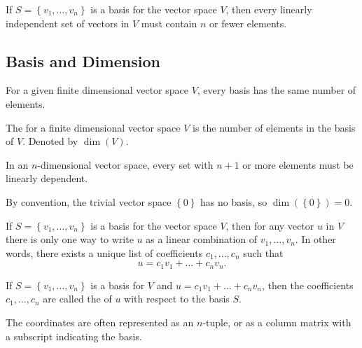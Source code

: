 \begin{corollary}
  If $S = \left\{v_{1}, \dots, v_{n}\right\}$ is a basis for the vector space $V$, then every linearly independent
  set of vectors in $V$ must contain $n$ or fewer elements.
\end{corollary}

\subsection{Basis and Dimension}
\begin{corollary}
  For a given finite dimensional vector space $V$, every basis has the same number of elements.
\end{corollary}

\begin{definition}
  The  for a finite dimensional vector space $V$ is the number of elements in the basis of $V$.
  Denoted by $\dim(V)$.
\end{definition}

\begin{corollary}
  In an $n$-dimensional vector space, every set with $n + 1$ or more elements must be linearly dependent.
\end{corollary}

\begin{remark}
  By convention, the trivial vector space $\left\{0\right\}$ has no basis, so $\dim(\left\{0\right\}) = 0$.
\end{remark}

\begin{theorem}
  If $S = \left\{v_{1}, \dots, v_{n}\right\}$ is a basis for the vector space $V$, then for any vector $u$
  in $V$ there is only one way to write $u$ as a linear combination of $v_{1}, \dots, v_{n}$.
  In other words, there exists a unique list of coefficients $c_{1}, \dots, c_{n}$ such that
  \begin{equation*}
    u = c_{1}v_{1} + \dots + c_{n}v_{n}.
  \end{equation*}
\end{theorem}

\begin{definition}
  If $S = \left\{v_{1}, \dots, v_{n}\right\}$ is a basis for $V$ and $u = c_{1}v_{1} + \dots + c_{n}v_{n}$,
  then the coefficients $c_{1}, \dots, c_{n}$ are called the  of $u$ with respect to the basis $S$.
\end{definition}

The coordinates are often represented as an $n$-tuple, or as a column matrix with a subscript indicating the basis.
  
